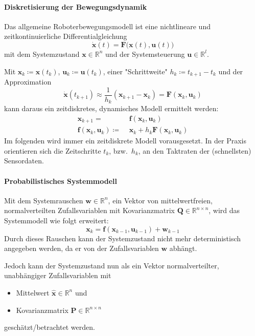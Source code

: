 \documentclass[a4paper, 11pt, accentcolor = tud3b]{tudreport}
\newcommand{\R}{\mathbb{R}}
\newcommand{\mat}[1]{\boldsymbol{#1}}
\renewcommand{\vec}[1]{\boldsymbol{\mathbf{#1}}}
\newcommand{\bzw}{bzw.~}
\begin{document}
					\paragraph{Diskretisierung der Bewegungsdynamik}
						Das allgemeine Roboterbewegungsmodell ist eine nichtlineare und zeitkontinuierliche Differentialgleichung
						\begin{equation*}
							\dot{\vec{x}}(t) = \vec{F}\big(\vec{x}(t), \vec{u}(t)\big)
						\end{equation*}
						mit dem Systemzustand \( \vec{x} \in \R^n \) und der Systemsteuerung \( \vec{u} \in \R^l \).
						
						Mit \( \vec{x}_k \coloneqq \vec{x}(t_k) \), \( \vec{u}_k \coloneqq \vec{u}(t_k) \), einer "Schrittweite" \( h_k \coloneqq t_{k + 1} - t_k \) und der Approximation
						\begin{equation*}
							\dot{\vec{x}}(t_{k + 1}) \approx \frac{1}{h_k} (\vec{x}_{k + 1} - \vec{x}_k) = \vec{F}(\vec{x}_k, \vec{u}_k)
						\end{equation*}
						kann daraus ein zeitdiskretes, dynamisches Modell ermittelt werden:
						\begin{align*}
							\vec{x}_{k + 1} =                       & \,\, \vec{f}(\vec{x}_k, \vec{u}_k)                 \\
							\vec{f}(\vec{x}_k, \vec{u}_k) \coloneqq & \,\, \vec{x}_k + h_k \vec{F}(\vec{x}_k, \vec{u}_k)
						\end{align*}
						Im folgenden wird immer ein zeitdiskrete Modell vorausgesetzt. In der Praxis orientieren sich die Zeitschritte \( t_k \), \bzw \( h_k \), an den Taktraten der (schnellsten) Sensordaten.
					
					\paragraph{Probabilistisches Systemmodell}
						Mit dem Systemrauschen \( \vec{w} \in \R^n \), ein Vektor von mittelwertfreien, normalverteilten Zufallsvariablen mit Kovarianzmatrix \( \mat{Q} \in \R^{n \times n} \), wird das Systemmodell wie folgt erweitert:
						\begin{equation*}
							\vec{x}_k = \vec{f}(\vec{x}_{k - 1}, \vec{u}_{k - 1}) + \vec{w}_{k - 1}
						\end{equation*}
						Durch dieses Rauschen kann der Systemzustand nicht mehr deterministisch angegeben werden, da er von der Zufallsvariablen \( \vec{w} \) abhängt.
						
						Jedoch kann der Systemzustand nun als ein Vektor normalverteilter, unabhängiger Zufallsvariablen mit
						\begin{itemize}
							\item Mittelwert \( \hat{\vec{x}} \in \R^n \) und
							\item Kovarianzmatrix \( \mat{P} \in \R^{n \times n} \)
						\end{itemize}
						geschätzt/betrachtet werden.
					
\end{document}
